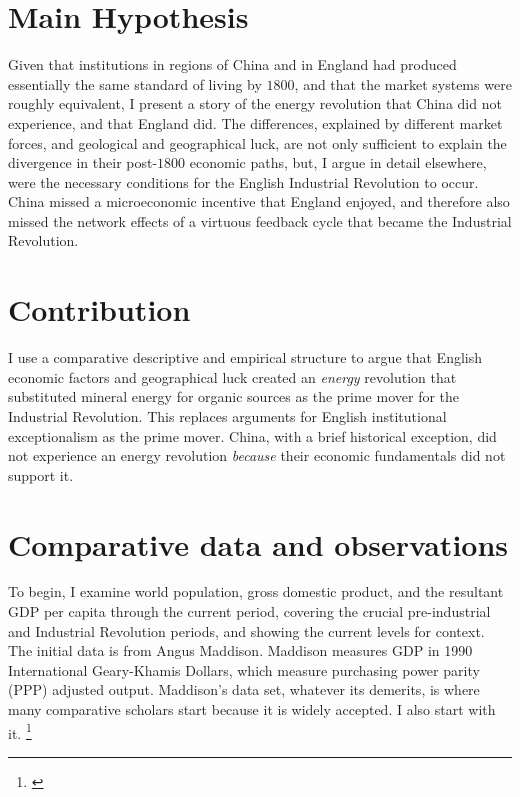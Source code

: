 \documentclass[12pt]{article}
\numberwithin{equation}{section}
\begin{document}
	
	\section{Main Hypothesis}
	Given that institutions in regions of China and in England had produced essentially the same standard of living by $1800$, and that the market systems were roughly equivalent, I present a story of the energy revolution that China did not experience, and that England did. The differences, explained by different market forces, and geological and geographical luck, are not only sufficient to explain the divergence in their post-$1800$ economic paths, but, I argue in detail elsewhere, were the necessary conditions for the English Industrial Revolution to occur. China missed a microeconomic incentive that England enjoyed, and therefore also missed the network effects of a virtuous feedback cycle that became the Industrial Revolution.
	
	\section{Contribution}
	
	I use a comparative descriptive and empirical structure to argue that English economic factors and geographical luck created an \textit{energy} revolution that substituted mineral energy for organic sources as the prime mover for the Industrial Revolution. This replaces arguments for English institutional exceptionalism as the prime mover. China, with a brief historical exception, did not experience an energy revolution \textit{because} their economic fundamentals did not support it. 
	
	\section{Comparative data and observations}
	
		To begin, I examine world population, gross domestic product, and the resultant GDP per capita through the current period, covering the crucial pre-industrial and Industrial Revolution periods, and showing the current levels for context. The initial data is from Angus Maddison. Maddison measures GDP in 1990 International Geary-Khamis Dollars, which measure purchasing power parity (PPP) adjusted output. Maddison's data set, whatever its demerits, is where many comparative scholars start because it is widely accepted. I also start with it. \footnote{\citet{maddison_maddison_2010}}
		
\end{document}
